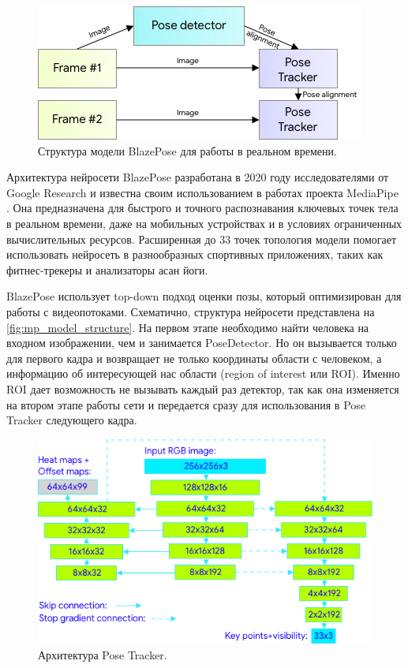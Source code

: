 \begin{figure}[b]
	\centering
	\includegraphics[width=.8\textwidth]{./images/review/blazepose_structure.jpg}
	\caption{Структура модели BlazePose для работы в реальном времени. \cite{BlazePose}}
	\label{fig:mp_model_structure}
\end{figure}

Архитектура нейросети BlazePose разработана в 2020 году исследователями от Google Research и известна своим использованием в работах проекта MediaPipe \cite{BlazePose, mediapipe}. Она предназначена для быстрого и точного распознавания ключевых точек тела в реальном времени, даже на мобильных устройствах и в условиях ограниченных вычислительных ресурсов. Расширенная до 33 точек топология модели помогает использовать нейросеть в разнообразных спортивных приложениях, таких как фитнес-трекеры и анализаторы асан йоги.

BlazePose использует top-down подход оценки позы, который оптимизирован для работы с видеопотоками. Схематично, структура нейросети представлена на \autoref{fig:mp_model_structure}. На первом этапе необходимо найти человека на входном изображении, чем и занимается PoseDetector. Но он вызывается только для первого кадра и возвращает не только координаты области с человеком, а информацию об интересующей нас области (region of interest или ROI). Именно ROI дает возможность не вызывать каждый раз детектор, так как она изменяется на втором этапе работы сети и передается сразу для использования в Pose Tracker следующего кадра.

\begin{figure}[h]
	\centering
	\includegraphics[width=.8\textwidth]{./images/review/blazepose_architecture.jpg}
	\caption{Архитектура Pose Tracker. \cite{BlazePose}}
	\label{fig:mp_architecture}
\end{figure} 

